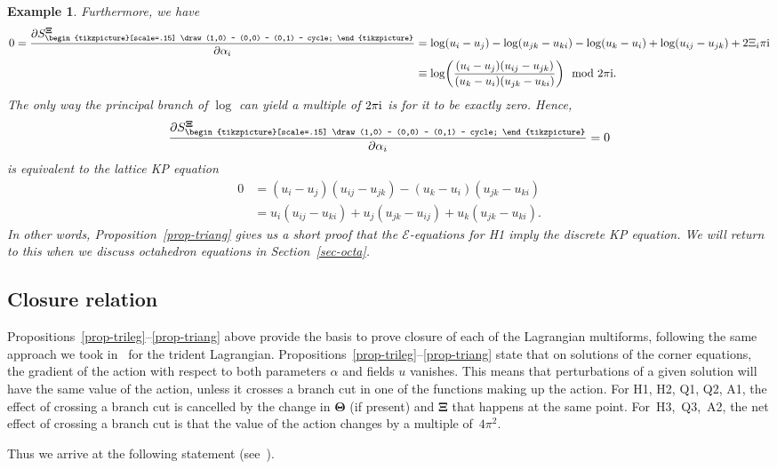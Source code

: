 \documentclass[10pt,a4paper]{amsart}
\newcommand{\triang}{{\begin{tikzpicture}[scale=.15]
			\draw (1,0) -- (0,0) -- (0,1) -- cycle;
\end{tikzpicture}}}
\newcommand{\pdv}[2]{\frac{\partial {#1}}{\partial {#2}}}
\renewcommand{\vec}{\boldsymbol}
\newtheorem{Example}[Definition]{Example}
\numberwithin{equation}{section}
\begin{document}
\begin{Example}
Furthermore, we have
\begin{align*}
 0 = \pdv{S_\triang^{\vec \Xi}}{\alpha_i} &= \log(u_i-u_j) - \log(u_{jk}-u_{ki}) - \log(u_k-u_i) + \log(u_{ij}-u_{jk}) + 2 \Xi_i \pi {\rm i}\\
 &\equiv \log \biggl( \frac{(u_i-u_j)(u_{ij}-u_{jk})}{(u_k-u_i)(u_{jk}-u_{ki})} \biggr) \mod 2 \pi {\rm i} .
\end{align*}
The only way the principal branch of $\log$ can yield a multiple of $2 \pi {\rm i}$ is for it to be exactly zero. Hence,
\[
\pdv{S_\triang^{\vec \Xi}}{\alpha_i} = 0
\]
 is equivalent to the lattice KP equation~\cite{nijhoff1984backlund}
\begin{align*}
 0 &= (u_i-u_j)(u_{ij}-u_{jk}) - (u_k-u_i)(u_{jk}-u_{ki}) \\
 &= u_i(u_{ij}-u_{ki}) + u_j(u_{jk}-u_{ij}) + u_k(u_{jk}-u_{ki}) .
\end{align*}
In other words, Proposition~\ref{prop-triang} gives us a short proof that the $\mathcal{E}$-equations for H1 imply the discrete KP equation. We will return to this when we discuss octahedron equations in Section~\ref{sec-octa}.
\end{Example}


\subsection{Closure relation}

Propositions~\ref{prop-trileg}--\ref{prop-triang} above provide the basis to prove closure of each of the Lagrangian multiforms, following the same approach we took in~\cite{richardson2025discrete1} for the trident Lagrangian. Propositions~\mbox{\ref{prop-trileg}--\ref{prop-triang}} state that on solutions of the corner equations, the gradient of the action with respect to both parameters $\alpha$ and fields $u$ vanishes. This means that perturbations of a given solution will have the same value of the action, unless it crosses a branch cut in one of the functions making up the action. For H1, H2, Q1, Q2, A1, the effect of crossing a branch cut is cancelled by the change in $\vec \Theta$ (if present) and $\vec \Xi$ that happens at the same point. For~H3,~Q3,~A2, the net effect of crossing a branch cut is that the value of the action changes by a multiple of~$4 \pi^2$.

Thus we arrive at the following statement (see~\cite[Theorem~3.5]{richardson2025discrete1}).
\end{document}
